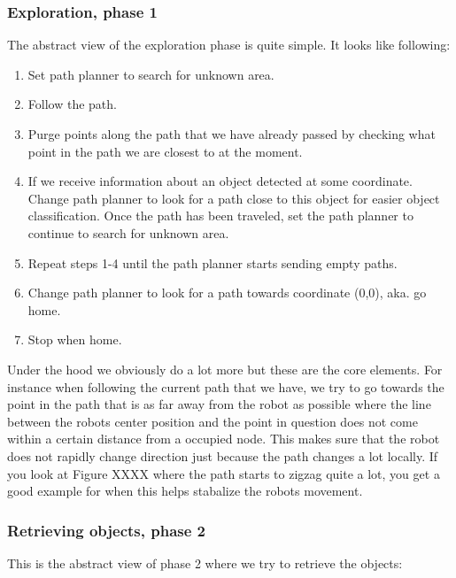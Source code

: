 \subsubsection{Exploration, phase 1}

The abstract view of the exploration phase is quite simple. It looks like following:

\begin{enumerate}
\item Set path planner to search for unknown area.
\item Follow the path.
\item Purge points along the path that we have already passed by checking what point in the path we are closest to at the moment.
\item If we receive information about an object detected at some coordinate. Change path planner to look for a path close to this object for easier object classification. Once the path has been traveled, set the path planner to continue to search for unknown area.
\item Repeat steps 1-4 until the path planner starts sending empty paths. 
\item Change path planner to look for a path towards coordinate (0,0), aka. go home.
\item Stop when home.
\end{enumerate}

Under the hood we obviously do a lot more but these are the core elements. For instance when following the current path that we have, we try to go towards the point in the path that is as far away from the robot as possible where the line between the robots center position and the point in question does not come within a certain distance from a occupied node. This makes sure that the robot does not rapidly change direction just because the path changes a lot locally. If you look at Figure XXXX where the path starts to zigzag quite a lot, you get a good example for when this helps stabalize the robots movement. 

\subsubsection{Retrieving objects, phase 2}

This is the abstract view of phase 2 where we try to retrieve the objects:

